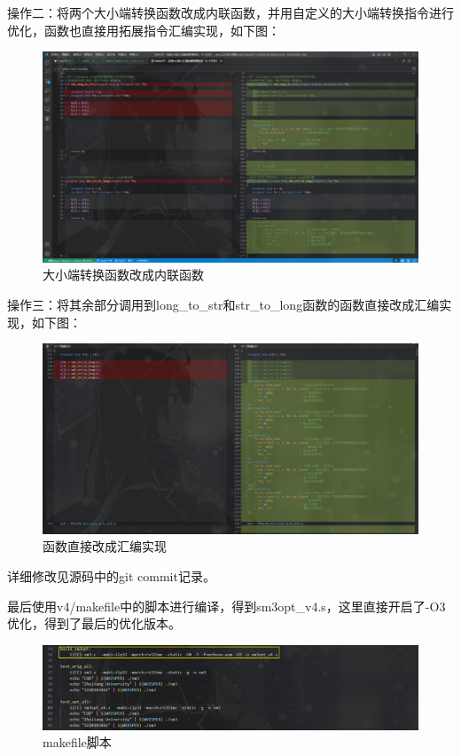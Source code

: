 \documentclass[12pt,hyperref,a4paper,UTF8]{ctexart}
\begin{document}
  操作二：将两个大小端转换函数改成内联函数，并用自定义的大小端转换指令进行优化，函数也直接用拓展指令汇编实现，如下图：

    \begin{figure}[H]
        \centering
        \includegraphics[width =1.0\textwidth]{figures/fig/image29.png}
        \caption{大小端转换函数改成内联函数}
    \end{figure}

  操作三：将其余部分调用到long\_to\_str和str\_to\_long函数的函数直接改成汇编实现，如下图：

    \begin{figure}[H]
        \centering
        \includegraphics[width =1.0\textwidth]{figures/fig/image30.png}
        \caption{函数直接改成汇编实现}
    \end{figure}

    详细修改见源码中的git commit记录。
    
    最后使用v4/makefile中的脚本进行编译，得到sm3opt\_v4.s，这里直接开启了-O3优化，得到了最后的优化版本。
    \begin{figure}[H]
        \centering
        \includegraphics[width =1.0\textwidth]{figures/fig/image31.png}
        \caption{makefile脚本}
    \end{figure}
\end{document}
